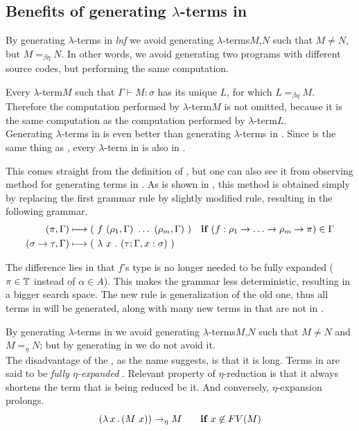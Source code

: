\documentclass[12pt,a4paper]{report}
\newcommand{\lterm}{$\lambda$-term\xspace}
\newcommand{\lterms}{$\lambda$-terms\xspace}
\newcommand{\turst}[3]{$#1\vdash{}#2:#3$\xspace}
\newcommand{\GMS}{\turst{\Gamma}{M}{\sigma}}
\begin{document}
\subsection{Benefits of generating \lterms in \lnf}
\label{benefits}

By generating \lterms in \textit{lnf} we avoid generating 
\lterms $M$,$N$ such that $M \not= N$, but $M =_{\beta\eta} N$.
In other words, we avoid generating two programs with different 
source codes, but performing the same computation.

Every \lterm $M$ such that \GMS has its unique \lnf $L$, 
for which $L =_{\beta\eta} M$.
Therefore the computation performed by \lterm $M$ 
is not omitted, because it is the same computation
as the computation performed by \lterm $L$. \\

Generating \lterms in \lnf is even better than generating 
\lterms in \bnf. Since \lnf is the same thing as \beenf,
every \lterm in \lnf is also in \bnf. 

This comes straight from the definition of \beenf, 
but one can also see it from observing method for generating
terms in \bnf. As is shown in \cite{barendregt10}, 
this method is obtained simply by replacing  
the first grammar rule by slightly modified rule,
resulting in the following grammar.
\begin{align*}
( \pi , \Gamma )  
&\gar
(~f~( \rho_1 , \Gamma )~\dots~( \rho_m , \Gamma )~)
& \textbf{if } (f : \rho_1 \ar \dots \ar \rho_m \ar \pi) \in \Gamma
\\ 
( \sigma \rightarrow \tau , \Gamma )  
&\gar
(~\lambda~x~.~( \tau ; \Gamma,x:\sigma )~)
&   
\end{align*}

The difference lies in that $f$'s type is no longer needed to be fully expanded
($\pi \in \mathbb{T}$ instead of $\alpha \in A$). This makes the grammar less deterministic,
resulting in a bigger search space. The new rule is generalization of the old one,
thus all terms in \lnf will be generated, along with many new terms in \bnf that 
are not in \lnf. 
    
By generating \lterms in \lnf we avoid generating 
\lterms $M$,$N$ such that $M \not= N$ and $M =_{\eta} N$; 
but by generating in \bnf we do not avoid it.\\


The disadvantage of the \lnf, as the name suggests, is that it is long.
Terms in \lnf are said to be \textit{fully $\eta$-expanded} \cite{barendregt10}. 
Relevant property of $\eta$-reduction is that it always shortens the term
that is being reduced be it. And conversely, $\eta$-expansion prolongs.
$$( \lambda \, x \, . \, (M~x) ) \rightarrow_\eta M \textbf{ ~~~~if } x \not\in FV(M) $$
\end{document}
